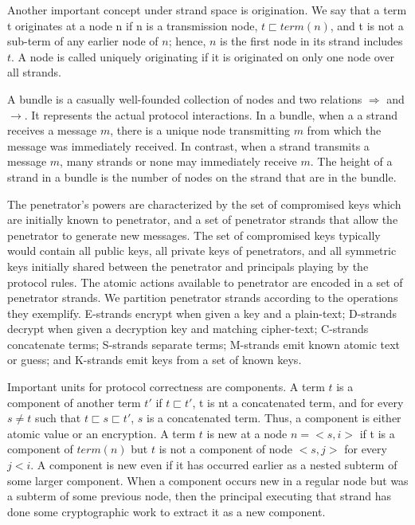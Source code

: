 Another important concept under strand space is origination. We say that a term t originates at a node n if n is a transmission node, $t \sqsubset term(n)$, and t is not a sub-term of any earlier node of $n$; hence, $n$ is the first node in its strand includes $t$. A node is called uniquely originating if it is originated on only one node over all strands.

A bundle is a casually well-founded collection of nodes and two relations $\Rightarrow$ and $\rightarrow$. It represents the actual protocol interactions. In a bundle, when a a strand receives a message $m$, there is a unique node transmitting $m$ from which the message was immediately  received. In contrast, when a strand transmits a message $m$, many strands or none may immediately receive $m$. The height of a strand in a bundle is the number of nodes on the strand that are in the bundle.

The penetrator's powers are characterized by the set of compromised keys which are initially known to penetrator, and a set of penetrator strands that allow the penetrator to generate new messages. The set of compromised keys typically would contain all public keys, all private keys of penetrators, and all symmetric keys initially shared between the penetrator and principals playing by the protocol rules. The atomic actions available to penetrator are encoded in a set of penetrator strands. We partition penetrator strands according to the operations they exemplify. E-strands encrypt when given a key and a plain-text; D-strands decrypt when given a decryption key and matching cipher-text; C-strands concatenate terms; S-strands separate terms; M-strands emit known atomic text or guess; and K-strands emit keys from a set of known keys.

Important units for protocol correctness are components. A term $t$ is a component of another term $t'$ if $t \sqsubset t'$, t is nt a concatenated term, and for every $s \neq t$ such that $t \sqsubset s \sqsubset t'$, $s$ is a concatenated term. Thus, a component is either atomic value or an encryption. A term $t$ is new at a node $n=<s,i>$ if t is a component of $term(n)$ but $t$ is not a component of node $<s,j>$ for every $j < i$. A component is new even if it has occurred earlier as a nested subterm of some larger component. When a component occurs new in a regular node but was a subterm of some previous node, then the principal executing that strand has done some cryptographic work to extract it as a new component\cite{Guttman}. 

